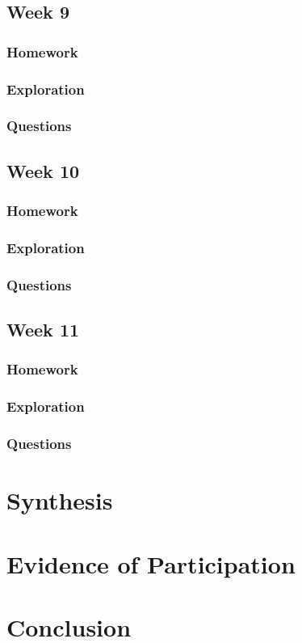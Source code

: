 \documentclass{article}
\theoremstyle{theorem}
\theoremstyle{definition}
\theoremstyle{remark}
\begin{document}
\subsection{Week 9}
\subsubsection{Homework}
\subsubsection{Exploration}
\subsubsection{Questions}

\subsection{Week 10}
\subsubsection{Homework}
\subsubsection{Exploration}
\subsubsection{Questions}

\subsection{Week 11}
\subsubsection{Homework}
\subsubsection{Exploration}
\subsubsection{Questions}

\section{Synthesis}

\section{Evidence of Participation}

\section{Conclusion}\label{conclusion}

\begin{thebibliography}{9}
\end{thebibliography}
\end{document}
